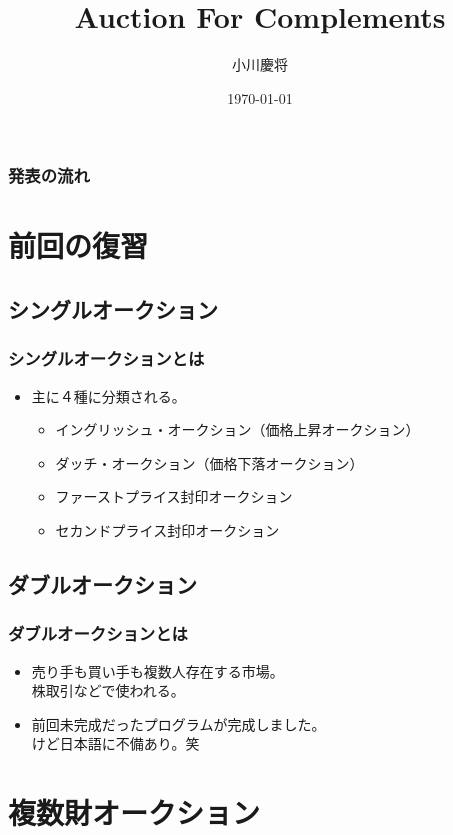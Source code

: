 \documentclass[dvipdfmx,12pt]{beamer}
\title{Auction For Complements}
\author{小川慶将}
\date{\today}
\begin{document}
\begin{frame}\frametitle{}
 \titlepage
\end{frame}

\begin{frame}\frametitle{発表の流れ}
 \tableofcontents
\end{frame}

\section{前回の復習}
\subsection{シングルオークション}
\begin{frame}
\frametitle{シングルオークションとは}
\begin{itemize}\setlength{\parskip}{0.5em}
\item
主に４種に分類される。
\begin{itemize}\setlength{\parskip}{0.5em}
\item
イングリッシュ・オークション（価格上昇オークション）
\item
ダッチ・オークション（価格下落オークション）
\item
ファーストプライス封印オークション
\item
セカンドプライス封印オークション
\end{itemize}
\end{itemize}
\end{frame}


\subsection{ダブルオークション}
\begin{frame}
\frametitle{ダブルオークションとは}
\begin{itemize}\setlength{\parskip}{0.5em}
\item
売り手も買い手も複数人存在する市場。\\
株取引などで使われる。\pause
\item
前回未完成だったプログラムが完成しました。\\
けど日本語に不備あり。笑
\end{itemize}
\end{frame}

\section{複数財オークション}
\end{document}

